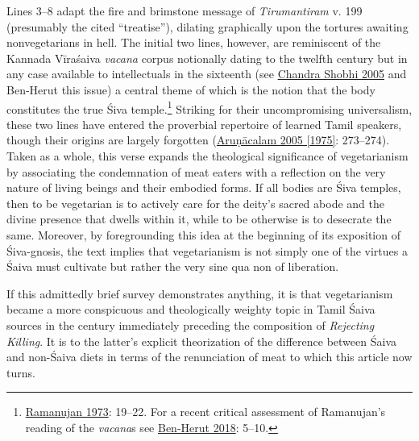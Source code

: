 Lines 3–8 adapt the fire and brimstone message of \emph{{Tirumantiram}} v. 199 (presumably the cited “treatise”), dilating graphically upon the tortures awaiting nonvegetarians in hell. The initial two lines, however, are reminiscent of the Kannada Vīraśaiva \emph{vacana} corpus  \Dash  notionally dating to the twelfth century but in any case available to intellectuals in the sixteenth (see \hyperref[ChandraShobhi2005]{Chandra Shobhi 2005} and Ben-Herut this issue)  \Dash  a central theme of which is the notion that the body constitutes the true Śiva temple.\footnote{%
\hyperref[Ramanujan1973]{Ramanujan 1973}: 19–22. For a recent critical assessment of Ramanujan’s reading of the \emph{vacana}s see \hyperref[BebHerut2018]{Ben-Herut 2018}: 5–10.
}
 Striking for their uncompromising universalism, these two lines have entered the proverbial repertoire of learned Tamil speakers, though their origins are largely forgotten (\hyperref[Arunacalam2005]{Aruṇācalam 2005 [1975]}: 273–274). Taken as a whole, this verse expands the theological significance of vegetarianism by associating the condemnation of meat eaters with a reflection on the very nature of living beings and their embodied forms. If all bodies are Śiva temples, then to be vegetarian is to actively care for the deity’s sacred abode and the divine presence that dwells within it, while to be otherwise is to desecrate the same. Moreover, by foregrounding this idea at the beginning of its exposition of Śiva-gnosis, the text implies that vegetarianism is not simply one of the virtues a Śaiva must cultivate but rather the very sine qua non of liberation.


If this admittedly brief survey demonstrates anything, it is that vegetarianism became a more conspicuous and theologically weighty topic in Tamil Śaiva sources in the century immediately preceding the composition of \emph{Rejecting Killing}. It is to the latter’s explicit theorization of the difference between Śaiva and non-Śaiva diets in terms of the renunciation of meat to which this article now turns.

